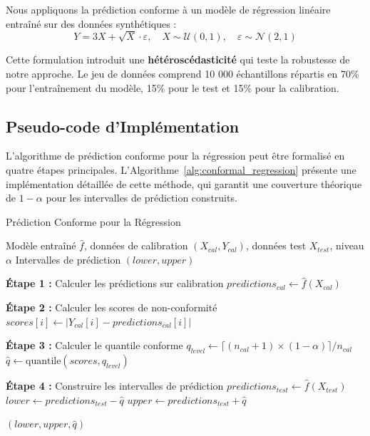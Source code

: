 \documentclass[a4paper,12pt]{article}
\begin{document}
Nous appliquons la prédiction conforme à un modèle de régression linéaire entraîné sur des données synthétiques :
$$Y = 3X + \sqrt{X} \cdot \varepsilon, \quad X \sim \mathcal{U}(0,1),\quad \varepsilon \sim \mathcal{N}(2,1)$$


Cette formulation introduit une \textbf{hétéroscédasticité} qui teste la robustesse de notre approche. Le jeu de données comprend 10 000 échantillons répartis en 70\% pour l'entraînement du modèle, 15\% pour le test et 15\% pour la calibration.
\subsection{Pseudo-code d'Implémentation}

L'algorithme de prédiction conforme pour la régression peut être formalisé en quatre étapes principales. L'Algorithme~\ref{alg:conformal_regression} présente une implémentation détaillée de cette méthode, qui garantit une couverture théorique de $1-\alpha$ pour les intervalles de prédiction construits.

\begin{algorithm}
\caption{Prédiction Conforme pour la Régression}
\label{alg:conformal_regression}
\begin{algorithmic}[1]
\REQUIRE Modèle entraîné $\hat{f}$, données de calibration $(X_{cal}, Y_{cal})$, données test $X_{test}$, niveau $\alpha$
\ENSURE Intervalles de prédiction $(lower, upper)$

\STATE \textbf{Étape 1 :} Calculer les prédictions sur calibration
\STATE $predictions_{cal} \leftarrow \hat{f}(X_{cal})$

\STATE \textbf{Étape 2 :} Calculer les scores de non-conformité
    \STATE $scores[i] \leftarrow |Y_{cal}[i] - predictions_{cal}[i]|$
\ENDFOR

\STATE \textbf{Étape 3 :} Calculer le quantile conforme
\STATE $q_{level} \leftarrow \lceil (n_{cal} + 1) \times (1 - \alpha) \rceil / n_{cal}$
\STATE $\hat{q} \leftarrow \text{quantile}(scores, q_{level})$

\STATE \textbf{Étape 4 :} Construire les intervalles de prédiction
\STATE $predictions_{test} \leftarrow \hat{f}(X_{test})$
\STATE $lower \leftarrow predictions_{test} - \hat{q}$
\STATE $upper \leftarrow predictions_{test} + \hat{q}$

\RETURN $(lower, upper, \hat{q})$
\end{algorithmic}
\end{algorithm}
\end{document}
